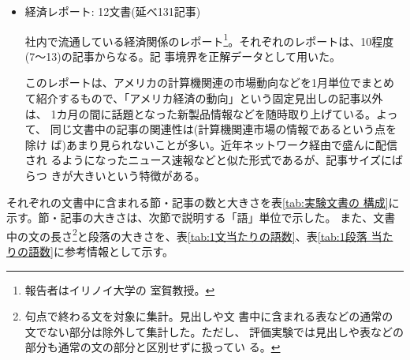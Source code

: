 \begin{itemize}
  (ii)(iii)は、それぞれの現代的なテーマに関連する事例をひとつの記事で
  一二例ずつ紹介していく連載形態をとっており、それぞれの記事の関連性は
  比較的緩やかである。小見出しは、それに続く数段落程度のまとまりの要旨
  を掲げたもの(例えば「親の扶養が問題に」)がほとんどであり、記号のみか
  らなる行は、3記事でまとめの部分の前に挿入されていたのみであった
  \footnote{例外として「近頃の麻酔事情」の連載の最後に一問一答形式の
    記事があったので、これについては、1つの問答をひとつの話題として取
    り扱った。}。



\item 経済レポート: 12文書(延べ131記事)
  
  社内で流通している経済関係のレポート\footnote{報告者はイリノイ大学の
    室賀教授。}。それぞれのレポートは、10程度(7〜13)の記事からなる。記
  事境界を正解データとして用いた。
  
  このレポートは、アメリカの計算機関連の市場動向などを1月単位でまとめ
  て紹介するもので、「アメリカ経済の動向」という固定見出しの記事以外は、
  1カ月の間に話題となった新製品情報などを随時取り上げている。よって、
  同じ文書中の記事の関連性は(計算機関連市場の情報であるという点を除け
  ば)あまり見られないことが多い。近年ネットワーク経由で盛んに配信され
  るようになったニュース速報などと似た形式であるが、記事サイズにばらつ
  きが大きいという特徴がある。

\end{itemize}

それぞれの文書中に含まれる節・記事の数と大きさを表\ref{tab:実験文書の
  構成}に示す。節・記事の大きさは、次節で説明する「語」単位で示した。
また、文書中の文の長さ\footnote{句点で終わる文を対象に集計。見出しや文
  書中に含まれる表などの通常の文でない部分は除外して集計した。ただし、
  評価実験では見出しや表などの部分も通常の文の部分と区別せずに扱ってい
  る。}と段落の大きさを、表\ref{tab:1文当たりの語数}、表\ref{tab:1段落
  当たりの語数}に参考情報として示す。

